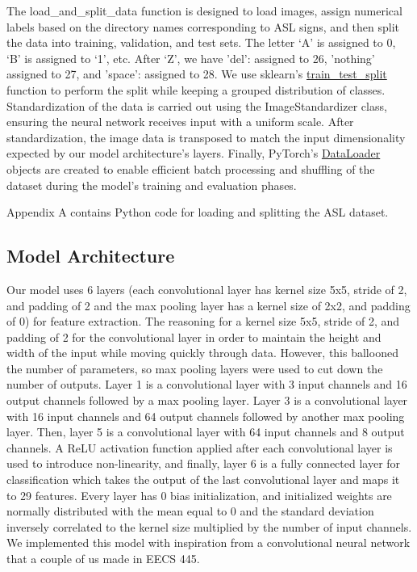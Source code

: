 \documentclass[10pt,twocolumn,letterpaper]{article}
\begin{document}
The load\_and\_split\_data function is designed to load images, assign numerical labels 
based on the directory names corresponding to ASL signs, and then split the data
into training, validation, and test sets. The letter ‘A’ is assigned to 0, ‘B’
is assigned to ‘1’, etc. After ‘Z’, we have 'del': assigned to 26, 'nothing'
assigned to 27, and 'space': assigned to 28. We use sklearn's
\href{https://scikit-learn.org/stable/modules/generated/sklearn.model_selection.train_test_split.html}{train\_test\_split}
function to perform the split while keeping a grouped distribution of classes.
Standardization of the data is carried out using the ImageStandardizer class, 
ensuring the neural network receives input with a uniform scale. After
standardization, the image data is transposed to match the input dimensionality
expected by our model architecture’s layers. Finally, PyTorch’s 
\href{https://pytorch.org/tutorials/beginner/basics/data_tutorial.html}{DataLoader}
objects are created to enable efficient batch processing and shuffling 
of the dataset during the model's training and evaluation phases.

Appendix A contains Python code for loading and splitting the ASL dataset.


\subsection{Model Architecture}
Our model uses 6 layers (each convolutional layer has kernel size 5x5, stride
of 2, and padding of 2 and the max pooling layer has a kernel size of 2x2,
and padding of 0) for feature extraction. The reasoning for a kernel size
5x5, stride of 2, and padding of 2 for the convolutional layer in order
to maintain the height and width of the input while moving quickly 
through data. However, this ballooned the number of parameters, so
max pooling layers were used to cut down the number of outputs. 
Layer 1 is a convolutional layer with 3 input channels and 16 output
channels followed by a max pooling layer. Layer 3 is a convolutional
layer with 16 input channels and 64 output channels followed by
another max pooling layer. Then, layer 5 is a convolutional
layer with 64 input channels and 8 output channels. A 
ReLU activation function applied after each convolutional 
layer is used to introduce non-linearity, and finally, 
layer 6 is a fully connected layer for classification 
which takes the output of the last convolutional layer
and maps it to 29 features. Every layer has 0 bias initialization, 
and initialized weights are normally distributed with the mean equal
to 0 and the standard deviation inversely correlated to the kernel 
size multiplied by the number of input channels. We implemented this
model with inspiration from a convolutional neural network that 
a couple of us made in EECS 445.
\end{document}
